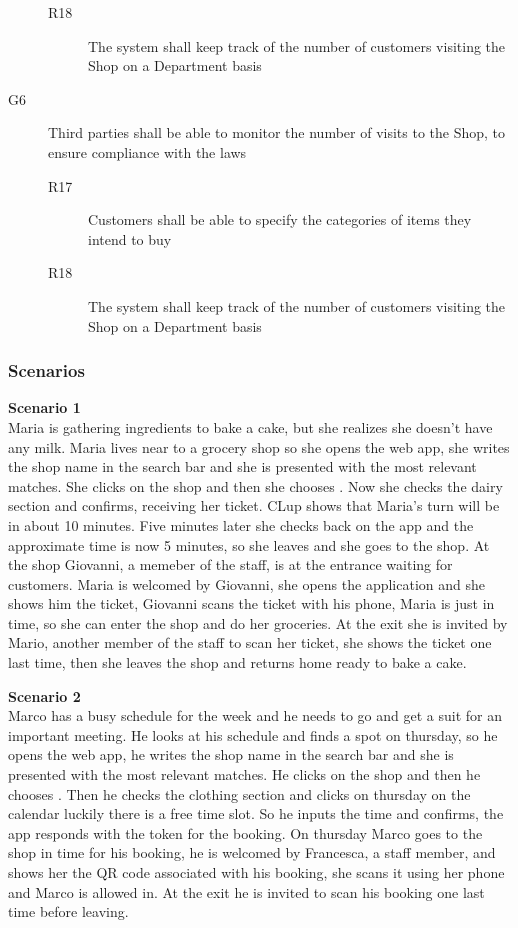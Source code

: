 \begin{description}
\begin{description}
              \item [R18] The system shall keep track of the number of customers visiting the Shop on a Department basis
          \end{description}
    \item [G6]  Third parties shall be able to monitor the number of visits to the Shop, to ensure compliance with the laws
          \begin{description}
              \item [R17] Customers shall be able to specify the categories of items they intend to buy
              \item [R18] The system shall keep track of the number of customers visiting the Shop on a Department basis
          \end{description}
\end{description}

\subsubsection{Scenarios}
\textbf{Scenario 1}\\
Maria is gathering ingredients to bake a cake, but she realizes she doesn't have any milk.
Maria lives near to a grocery shop so she opens the web app, she writes the shop name in the search bar and she is presented with the most relevant matches. She clicks on the shop and then she chooses . Now she checks the dairy section and confirms, receiving her ticket.
CLup shows that Maria's turn will be in about 10 minutes. Five minutes later she checks back on the app and the approximate time is now 5 minutes, so she leaves and she goes to the shop.
At the shop Giovanni, a memeber of the staff, is at the entrance waiting for customers. Maria is welcomed by Giovanni, she opens the application and she shows him the ticket, Giovanni scans the ticket with his phone, Maria is just in time, so she can enter the shop and do her groceries.
At the exit she is invited by Mario, another member of the staff to scan her ticket, she shows the ticket one last time, then she leaves the shop and returns home ready to bake a cake.

\textbf{Scenario 2}\\
Marco has a busy schedule for the week and he needs to go and get a suit for an important meeting. He looks at his schedule and finds a spot on thursday, so he opens the web app, he writes the shop name in the search bar and she is presented with the most relevant matches. He clicks on the shop and then he chooses . Then he checks the clothing section and clicks on thursday on the calendar luckily there is a free time slot. So he inputs the time and confirms, the app responds with the token for the booking. On thursday Marco goes to the shop in time for his booking, he is welcomed by Francesca, a staff member, and shows her the QR code associated with his booking, she scans it using her phone and Marco is allowed in. At the exit he is invited to scan his booking one last time before leaving.

